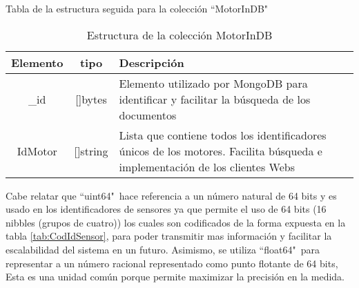 \vspace{1cm}


    \begin{table}[ht]
        \begin{center}
            Tabla de la estructura seguida para la colección ``MotorInDB"\ \\
            \vspace{0.3cm}
            \begin{tabular}{|c|c|p{11cm}|}
                \hline
                Elemento & tipo     & Descripción \\\hline\hline
                \_id      & []bytes  & Elemento utilizado por MongoDB para
                identificar y facilitar la búsqueda de los documentos\\\hline
                IdMotor  & []string & Lista que contiene todos los identificadores
                únicos de los motores. Facilita búsqueda e implementación de los
                clientes Webs\\\hline
            \end{tabular}
        \end{center}
        \caption[Estructura de MotorInDB]{Estructura de la colección MotorInDB}
        \label{tab:MotorInDBbson}
    \end{table}

    Cabe relatar que ``uint64"\  hace referencia a un número natural de 64 bits
    y es usado en los identificadores de sensores ya que permite el uso de 64
    bits (16 nibbles (grupos de cuatro)) los cuales son codificados de
    la forma expuesta en la tabla \ref{tab:CodIdSensor}, para
    poder transmitir mas información y facilitar la escalabilidad del sistema en
    un futuro.
    Asimismo, se utiliza
    ``float64"\ para representar  a un número racional representado como punto
    flotante de 64 bits, Esta es una unidad común porque permite maximizar la
    precisión en la medida.

